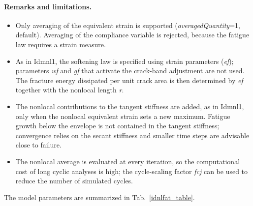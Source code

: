 \documentclass[a4paper]{article}
\newcommand{\param}[1]{{\it #1}}
\begin{document}
\paragraph{Remarks and limitations.}
\begin{itemize}
\item Only averaging of the equivalent strain is supported (\param{averagedQuantity}=1, default). Averaging of the compliance
variable is rejected, because the fatigue law requires a strain measure.
\item As in Idmnl1, the softening law is specified using strain parameters ({\it ef}); parameters {\it wf} and {\it gf} that
activate the crack-band adjustment are not used. The fracture energy dissipated per unit crack area is then determined
by {\it ef} together with the nonlocal length {\it r}.
\item The nonlocal contributions to the tangent stiffness are added, as in Idmnl1, only when the nonlocal equivalent strain sets a
new maximum. Fatigue growth below the envelope is not contained in the tangent stiffness; convergence relies on the secant stiffness and
smaller time steps are advisable close to failure.
\item The nonlocal average is evaluated at every iteration, so the computational cost of long cyclic analyses is high; the cycle-scaling
factor {\it fcj} can be used to reduce the number of simulated cycles.
\end{itemize}

The model parameters are summarized in Tab.~\ref{idnlfat_table}.
\end{document}
